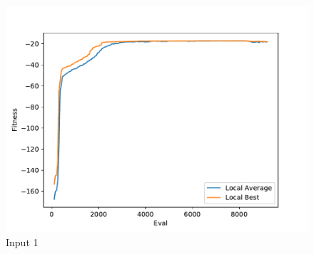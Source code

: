 \documentclass{standalone}
\begin{document}
\begin{figure}[!htb]
	\caption{Input 1}
	\label{fig:graph_1024}
	\includegraphics[width=\textwidth]{../graphs/graphs/1024.pdf}
\end{figure}
\end{document}
